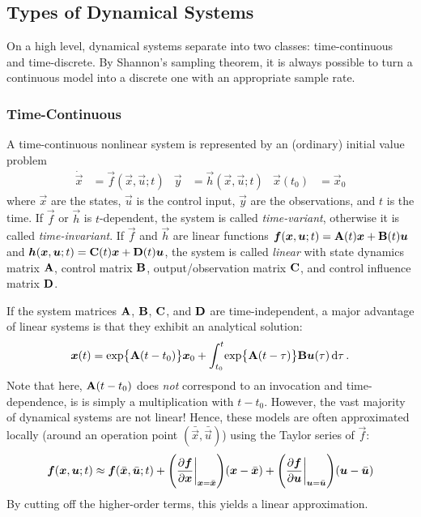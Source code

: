 		\subsection{Types of Dynamical Systems}
			On a high level, dynamical systems separate into two classes: time-continuous and time-discrete. By Shannon's sampling theorem, it is always possible to turn a continuous model into a discrete one with an appropriate sample rate.

			\subsubsection{Time-Continuous}
				A time-continuous nonlinear system is represented by an (ordinary) initial value problem
				\begin{align}
					\dot{\vec{x}} &= \vec{f}(\vec{x}, \vec{u}; t) &
					\vec{y} &= \vec{h}(\vec{x}, \vec{u}; t) &
					\vec{x}(t_0) &= \vec{x}_0
				\end{align}
				where \(\vec{x}\) are the states, \(\vec{u}\) is the control input, \(\vec{y}\) are the observations, and \(t\) is the time. If \(\vec{f}\) or \(\vec{h}\) is \(t\)-dependent, the system is called \emph{time-variant}, otherwise it is called \emph{time-invariant}. If \(\vec{f}\) and \(\vec{h}\) are linear functions \( \bm{f}(\bm{x}, \bm{u}; t) = \bm{\mathrm{A}}(t) \bm{x} + \bm{\mathrm{B}}(t) \bm{u} \) and \( \bm{h}(\bm{x}, \bm{u}; t) = \bm{\mathrm{C}}(t) \bm{x} + \bm{\mathrm{D}}(t) \bm{u} \), the system is called \emph{linear} with state dynamics matrix \(\bm{\mathrm{A}}\), control matrix \(\bm{\mathrm{B}}\), output/observation matrix \(\bm{\mathrm{C}}\), and control influence matrix \(\bm{\mathrm{D}}\).

				If the system matrices \(\bm{\mathrm{A}}\), \(\bm{\mathrm{B}}\), \(\bm{\mathrm{C}}\), and \(\bm{\mathrm{D}}\) are time-independent, a major advantage of linear systems is that they exhibit an analytical solution:
				\begin{equation}
					\bm{x}(t) = \exp\bigl\{ \bm{\mathrm{A}}(t - t_0) \bigr\} \bm{x}_0 + \int_{t_0}^{t}\! \exp\bigl\{ \bm{\mathrm{A}}(t - \tau) \bigr\} \bm{\mathrm{B}} \bm{u}(\tau) \dd{\tau}.
				\end{equation}
				Note that here, \( \bm{\mathrm{A}}(t - t_0) \) does \emph{not} correspond to an invocation and time-dependence, is is simply a multiplication with \(t - t_0\). However, the vast majority of dynamical systems are not linear! Hence, these models are often approximated locally (around an operation point \( (\bar{\vec{x}}, \bar{\vec{u}}) \)) using the Taylor series of \(\vec{f}\):
				\begin{equation}
					\bm{f}(\bm{x}, \bm{u}; t) \approx \bm{f}(\bar{\bm{x}}, \bar{\bm{u}}; t) + \Biggl( \pdv{\bm{f}}{\bm{x}}\bigg\vert_{\bm{x} = \bar{\bm{x}}} \Biggr) (\bm{x} - \bar{\bm{x}}) + \Biggl( \pdv{\bm{f}}{\bm{u}}\bigg\vert_{\bm{u} = \bar{\bm{u}}} \Biggr) (\bm{u} - \bar{\bm{u}})
				\end{equation}
				By cutting off the higher-order terms, this yields a linear approximation.

